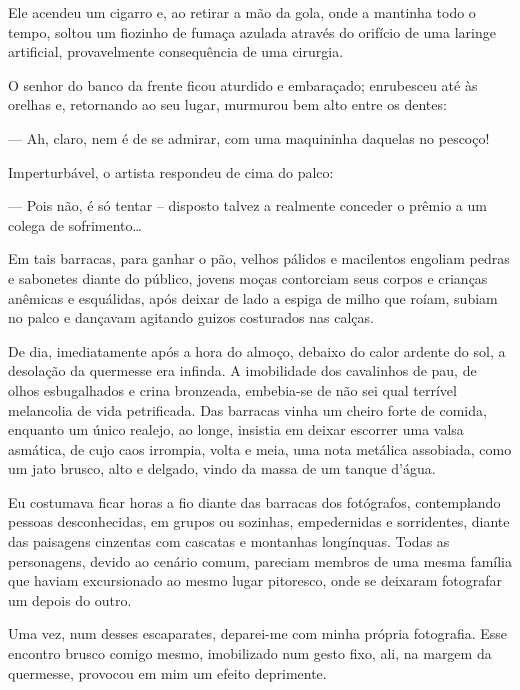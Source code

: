 Ele acendeu um cigarro e, ao retirar a mão da gola, onde a mantinha todo o tempo, soltou um fiozinho de fumaça azulada através do orifício de uma laringe artificial, provavelmente consequência de uma cirurgia. 

O senhor do banco da frente ficou aturdido e embaraçado; enrubesceu até às orelhas e, retornando ao seu lugar, murmurou bem alto entre os dentes: 

--- Ah, claro, nem é de se admirar, com uma maquininha daquelas no pescoço!

Imperturbável, o artista respondeu de cima do palco:

--- Pois não, é só tentar -- disposto talvez a realmente conceder o prêmio a um colega de sofrimento\dots

Em tais barracas, para ganhar o pão, velhos pálidos e macilentos engoliam pedras e sabonetes diante do público, jovens moças contorciam seus corpos e crianças anêmicas e esquálidas, após deixar de lado a espiga de milho que roíam, subiam no palco e dançavam agitando guizos costurados nas calças.

De dia, imediatamente após a hora do almoço, debaixo do calor ardente do sol, a desolação da quermesse era infinda. A imobilidade dos cavalinhos de pau, de olhos esbugalhados e crina bronzeada, embebia-se de não sei qual terrível melancolia de vida petrificada. Das barracas vinha um cheiro forte de comida, enquanto um único realejo, ao longe, insistia em deixar escorrer uma valsa asmática, de cujo caos irrompia, volta e meia, uma nota metálica assobiada, como um jato brusco, alto e delgado, vindo da massa de um tanque d'água.

Eu costumava ficar horas a fio diante das barracas dos fotógrafos, contemplando pessoas desconhecidas, em grupos ou sozinhas, empedernidas e sorridentes, diante das paisagens cinzentas com cascatas e montanhas longínquas. Todas as personagens, devido ao cenário comum, pareciam membros de uma mesma família que haviam excursionado ao mesmo lugar pitoresco, onde se deixaram fotografar um depois do outro.

Uma vez, num desses escaparates, deparei-me com minha própria fotografia. Esse encontro brusco comigo mesmo, imobilizado num gesto fixo, ali, na margem da quermesse, provocou em mim um efeito deprimente.

